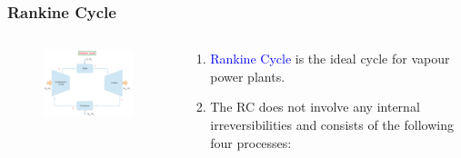 \documentclass[10pt,compress,handout,ignorenonframetext]{beamer}
\begin{document}
\begin{frame}
 \frametitle{Rankine Cycle}
 \begin{columns}
   \begin{column}[c]{0.6\linewidth}
    \begin{figure}%
     \begin{center}
      \includegraphics[width=7.5cm,clip]{./Pics/Simple_Rankine_Cycle}
     \end{center}
    \end{figure}  
   \end{column}
   \begin{column}[l]{0.4\linewidth}
    \begin{enumerate}
     \item <1->\textcolor{blue}{Rankine Cycle} is the ideal cycle for vapour power plants.
     \item <2-> The RC does not involve any internal irreversibilities and consists of the following four processes:
    \end{enumerate}
   \end{column}
  \end{columns}
 \normalsize
\end{frame}
\end{document}
